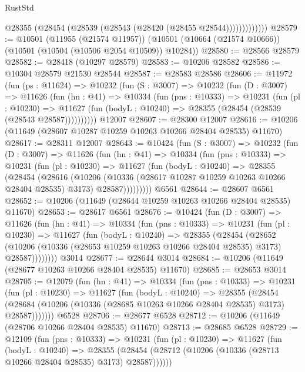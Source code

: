 \begin{lexlean}{RustStd}
\begin{coremodule}
                  @28355 (@28454 (@28539 (@28543 (@28420 (@28455 @28544)))))))))))))
@28579 := @10501
    (@11955 (@21574 @11957))
    (@10501 (@10664 (@21574 @10666)) (@10501 (@10504 (@10506 @2054 @10509)) @10284))
@28580 := @28566 @28579
@28582 := @28418 (@10297 @28579)
@28583 := @10206 @28582
@28586 := @10304 @28579 @21530 @28544
@28587 := @28583 @28586
@28606 := @11972
    (fun (ps : @11624) =>
    @10232
      (fun (S : @3007) =>
      @10232
        (fun (D : @3007) =>
        @11626
          (fun (hn : @41) =>
          @10334
            (fun (pns : @10333) =>
            @10231
              (fun (pl : @10230) =>
              @11627 (fun (bodyL : @10240) => @28355 (@28454 (@28539 (@28543 @28587))))))))))
    @12007
@28607 := @28300 @12007
@28616 := @10206 (@11649 (@28607 @10287 @10259 @10263 @10266 @28404 @28535) @11670)
@28617 := @28311 @12007
@28643 := @10424
    (fun (S : @3007) =>
    @10232
      (fun (D : @3007) =>
      @11626
        (fun (hn : @41) =>
        @10334
          (fun (pns : @10333) =>
          @10231
            (fun (pl : @10230) =>
            @11627
              (fun (bodyL : @10240) =>
              @28355
                (@28454
                  (@28616
                    (@10206
                      (@10336 (@28617 @10287 @10259 @10263 @10266 @28404 @28535) @3173)
                      @28587)))))))))
    @6561
@28644 := @28607 @6561
@28652 := @10206 (@11649 (@28644 @10259 @10263 @10266 @28404 @28535) @11670)
@28653 := @28617 @6561
@28676 := @10424
    (fun (D : @3007) =>
    @11626
      (fun (hn : @41) =>
      @10334
        (fun (pns : @10333) =>
        @10231
          (fun (pl : @10230) =>
          @11627
            (fun (bodyL : @10240) =>
            @28355
              (@28454
                (@28652
                  (@10206 (@10336 (@28653 @10259 @10263 @10266 @28404 @28535) @3173) @28587))))))))
    @3014
@28677 := @28644 @3014
@28684 := @10206 (@11649 (@28677 @10263 @10266 @28404 @28535) @11670)
@28685 := @28653 @3014
@28705 := @12079
    (fun (hn : @41) =>
    @10334
      (fun (pns : @10333) =>
      @10231
        (fun (pl : @10230) =>
        @11627
          (fun (bodyL : @10240) =>
          @28355
            (@28454
              (@28684 (@10206 (@10336 (@28685 @10263 @10266 @28404 @28535) @3173) @28587)))))))
    @6528
@28706 := @28677 @6528
@28712 := @10206 (@11649 (@28706 @10266 @28404 @28535) @11670)
@28713 := @28685 @6528
@28729 := @12109
    (fun (pns : @10333) =>
    @10231
      (fun (pl : @10230) =>
      @11627
        (fun (bodyL : @10240) =>
        @28355 (@28454 (@28712 (@10206 (@10336 (@28713 @10266 @28404 @28535) @3173) @28587))))))

\end{coremodule}
\end{lexlean}
